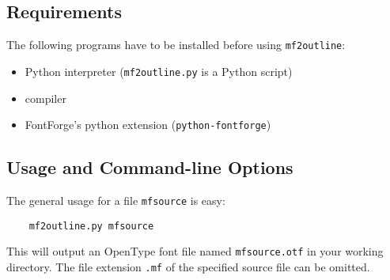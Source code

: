 \documentclass{scrartcl}
\begin{document}
\subsection{Requirements}
%
The following programs have to be installed before using \verb|mf2outline|:
%
\begin{itemize}
	\item Python interpreter (\verb|mf2outline.py| is a Python script)
	\item \MP{} compiler
	\item FontForge's python extension (\verb|python-fontforge|)
\end{itemize}
%
\subsection{Usage and Command-line Options}
%
The general usage for a \MF{} file \verb|mfsource| is easy:
\begin{verbatim}
	mf2outline.py mfsource
\end{verbatim}
%
This will output an OpenType font file named \verb|mfsource.otf| in your working directory. The file extension \verb|.mf| of the specified \MF{} source file can be omitted.
\end{document}
